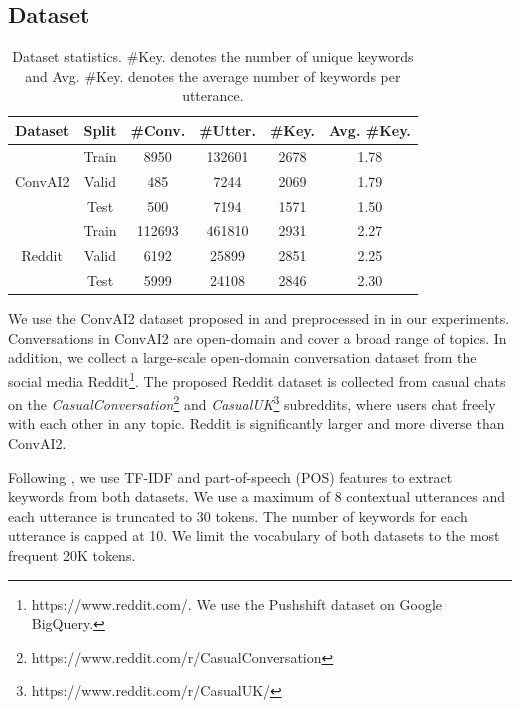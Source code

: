 \documentclass[letterpaper]{article} %
\begin{document}
\subsection{Dataset}
\label{sec: dataset}
\begin{table}[!t]
\small
\centering
\begin{tabular}{cccccc}
\hline
\textbf{Dataset} & \textbf{Split} & \textbf{\#Conv.} & \textbf{\#Utter.} & \textbf{\#Key.} & \textbf{Avg. \#Key.}\\
\hline
\multirow{3}{*}{ConvAI2} & Train & 8950 & 132601 & 2678 & 1.78\\
 & Valid & 485 & 7244 & 2069 & 1.79\\
 & Test & 500 & 7194 & 1571 & 1.50\\
\hline
\multirow{3}{*}{Reddit} & Train & 112693 & 461810 & 2931 & 2.27\\
& Valid & 6192 & 25899 & 2851 & 2.25\\
& Test & 5999 & 24108 & 2846 & 2.30\\
\hline
\end{tabular}
\caption{Dataset statistics. \#Key. denotes the number of unique keywords and Avg. \#Key. denotes the average number of keywords per utterance.}
\label{table: dataset}
\end{table}
We use the ConvAI2 dataset proposed in \cite{zhang2018personalizing,dinan2019second} and preprocessed in \cite{tang2019target} in our experiments. Conversations in ConvAI2 are open-domain and cover a broad range of topics. In addition, we collect a large-scale open-domain conversation dataset from the social media Reddit\footnote{https://www.reddit.com/. We use the Pushshift dataset on Google BigQuery.}. The proposed Reddit dataset is collected from casual chats on the \textit{CasualConversation}\footnote{https://www.reddit.com/r/CasualConversation} and \textit{CasualUK}\footnote{https://www.reddit.com/r/CasualUK/} subreddits, where users chat freely with each other in any topic. Reddit is significantly larger and more diverse than ConvAI2.

Following \cite{tang2019target}, we use TF-IDF and part-of-speech (POS) features to extract keywords from both datasets. We use a maximum of 8 contextual utterances and each utterance is truncated to 30 tokens. The number of keywords for each utterance is capped at 10. We limit the vocabulary of both datasets to the most frequent 20K tokens.
\end{document}
